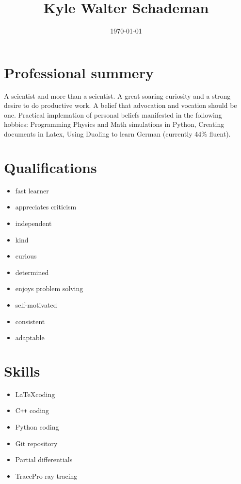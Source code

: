 \documentclass[8pt]{article}
\begin{document}
    \title{Kyle Walter Schademan}
    \date{\today}
    \maketitle
\section{Professional summery}\label{sec:int}

A scientist and more than a scientist.  A great soaring curiosity and a strong desire to do productive work.  A belief that advocation and vocation should be one.  Practical implemation of personal beliefs manifested in the following hobbies: Programming Physics and Math simulations in Python, Creating documents in Latex, Using Duoling to learn German (currently 44\% fluent).

\section{Qualifications}\label{sec:int}

    \begin{multicols}{3}
        \begin{itemize}
          \item fast learner
          \item appreciates criticism
          \item independent
          \item kind
          \item curious
          \item determined
          \item enjoys problem solving
          \item self-motivated
          \item consistent
          \item adaptable
        \end{itemize}
    \end{multicols}

\section{Skills}\label{sec:int}

    \begin{multicols}{3}
        \begin{itemize}
          \item \LaTeX coding
          \item C\texttt{++} coding
          \item Python coding
          \item Git repository
          \item Partial differentials
          \item TracePro ray tracing
        \end{itemize}
    \end{multicols}
          
\end{document}
